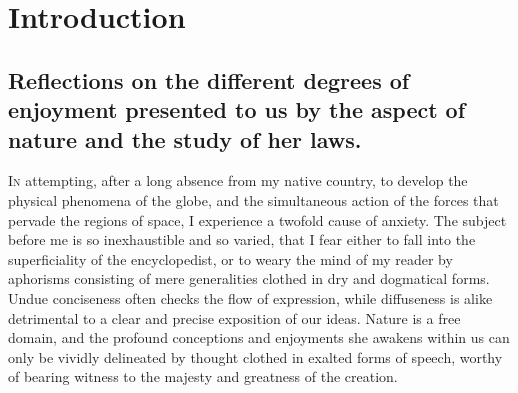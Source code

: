 
\chapter{Introduction}

\clearpage
    
\section[Reflections on the different ...]{Reflections on the different degrees of enjoyment presented to us by the aspect of nature and the study of her laws.}


\lettrine[lines=4]{\goudy I}{n} attempting, after a long absence from my native country, to develop the physical phenomena of the globe, and the simultaneous action of the forces that pervade the regions of space, I experience a twofold cause of anxiety. The subject before me is so inexhaustible and so varied, that I fear either to fall into the superficiality of the encyclopedist, or to weary the mind of my reader by aphorisms consisting of mere generalities clothed in dry and dogmatical forms. Undue conciseness often checks the flow of expression, while diffuseness is alike detrimental to a clear and precise exposition of our ideas. Nature is a free domain, and the profound conceptions and enjoyments she awakens within us can only be vividly delineated by thought clothed in exalted forms of speech, worthy of bearing witness to the majesty and greatness of the creation.

